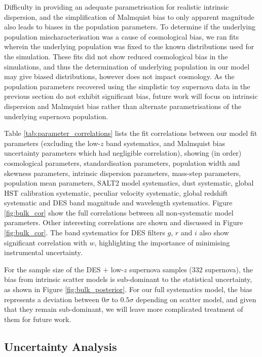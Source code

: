 \documentclass[a4paper,fleqn,usenatbib,manuscript]{emulateapj}
\newcommand{\blue}{\color{blue}}
\newcommand{\celeven}{\citetalias{Chotard2011}}
\begin{document}
Difficulty in providing an adequate parametrisation for realistic intrinsic dispersion, and the simplification of Malmquist bias to only apparent magnitude also leads to biases in the population parameters. {\blue To determine if the underlying population mischaracterisation was a cause of cosmological bias, we ran fits wherein the underlying population was fixed to the known distributions used for the simulation. These fits did not show reduced cosmological bias in the {\celeven} simulations, and thus the determination of underlying population in our model may give biased distributions, however does not impact cosmology.} As the population parameters recovered using the simplistic toy supernova data in the previous section do not exhibit significant bias, future work will focus on intrinsic dispersion and Malmquist bias rather than alternate parametrisations of the underlying supernova population.

Table \ref{tab:parameter_correlations} lists the fit correlations between our model fit parameters (excluding the low-$z$ band systematics, and Malmquist bias uncertainty parameters which had negligible correlation), showing (in order) cosmological parameters, standardisation parameters, population width and skewness parameters, intrinsic dispersion parameters, mass-step parameters, population mean parameters, SALT2 model systematics, dust systematic, global HST calibration systematic, peculiar velocity systematic, global redshift systematic and DES band magnitude and wavelength systematics. Figure \ref{fig:bulk_cor} show the full correlations between all non-systematic model parameters. Other interesting correlations are shown and discussed in Figure \ref{fig:bulk_cor}. The band systematics for DES filters $g$, $r$ and $i$ also show significant correlation with $w$, highlighting the importance of minimising instrumental uncertainty.


For the sample size of the DES $+$ low-$z$ supernova samples (332 supernova), the bias from intrinsic scatter models is sub-dominant to the statistical uncertainty, as shown in Figure \ref{fig:bulk_posterior}. For our full systematics model, the bias represents a deviation between $0\sigma$ to $0.5\sigma$ depending on scatter model, and given that they remain sub-dominant, we will leave more complicated treatment of them for future work.




\subsection{Uncertainty Analysis}
\label{sec:ucnert}
\end{document}
